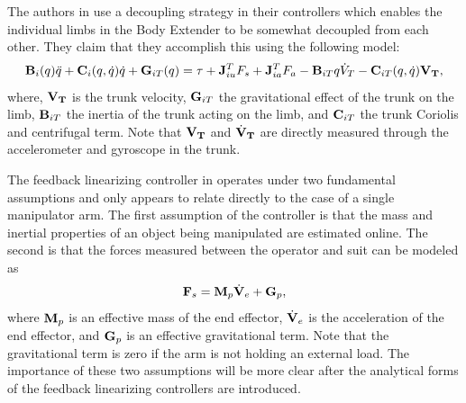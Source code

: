 \begin{refsection}
The authors in \cite{body_control_2012} use a decoupling strategy in their controllers which enables the individual limbs in the Body Extender to be somewhat decoupled from each other.  They claim that they accomplish this using the following model:
\begin{equation}
{\bf B}_i(q) \ddot{q} + {\bf C}_i(q,\dot{q})\dot{q} + {\bf G}_{iT}(q) = {\bf \tau} + {\bf J}^T_{iu}F_s + {\bf J}^T_{ia}F_a - {\bf B}_{iT}{q}\dot{V}_T - {\bf C}_{iT}(q,\dot{q}){\bf V_T},
\end{equation}
where, ${\bf V_T}$ is the trunk velocity, ${\bf G}_{iT}$ the gravitational effect of the trunk on the limb, ${\bf B}_{iT}$ the inertia of the trunk acting on the limb, and ${\bf C}_{iT}$ the trunk Coriolis and centrifugal term.  Note that ${\bf V_T}$ and $\dot{{\bf V}}_{\bf T}$ are directly measured through the accelerometer and gyroscope in the trunk.

The feedback linearizing controller in \cite{} operates under two fundamental assumptions and only appears to relate directly to the case of a single manipulator arm.  The first assumption of the controller is that the mass and inertial properties of an object being manipulated are estimated online.  The second is that the forces measured between the operator and suit can be modeled as
\begin{equation}
{\bf F}_s = {\bf M}_p \dot{{\bf V}}_e + {\bf G}_p,
\label{eq:forceEq}
\end{equation}
where ${\bf M}_p$ is an effective mass of the end effector, $\dot{{\bf V}}_e$ is the acceleration of the end effector, and ${\bf G}_p$ is an effective gravitational term.  Note that the gravitational term is zero if the arm is not holding an external load.  The importance of these two assumptions will be more clear after the analytical forms of the feedback linearizing controllers are introduced. 


\end{refsection}
